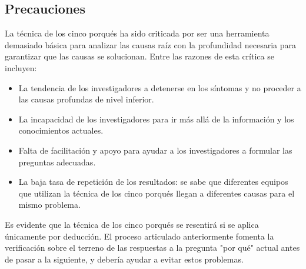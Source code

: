 \subsection{Precauciones}

La técnica de los cinco porqués ha sido criticada por ser una herramienta demasiado básica para analizar las causas raíz con la profundidad necesaria para garantizar que las causas se solucionan.
Entre las razones de esta crítica se incluyen:

\begin{itemize}
    \item La tendencia de los investigadores a detenerse en los síntomas y no proceder a las causas profundas de nivel inferior.
    \item La incapacidad de los investigadores para ir más allá de la información y los conocimientos actuales.
    \item Falta de facilitación y apoyo para ayudar a los investigadores a formular las preguntas adecuadas.
    \item La baja tasa de repetición de los resultados: se sabe que diferentes equipos que utilizan la técnica de los cinco porqués llegan a diferentes causas para el mismo problema.
\end{itemize}

Es evidente que la técnica de los cinco porqués se resentirá si se aplica únicamente por deducción.
El proceso articulado anteriormente fomenta la verificación sobre el terreno de las respuestas a la pregunta "por qué" actual antes de pasar a la siguiente, y debería ayudar a evitar estos problemas.